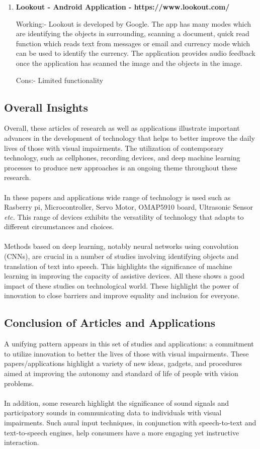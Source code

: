 \documentclass[MScCS]{uccthesis}
\begin{document}
\begin{enumerate}
\item \textbf{Lookout - Android Application - https://www.lookout.com/}

Working:-
Lookout is developed by Google.
The app has many modes which are identifying the objects in surrounding, scanning a document, quick read function which reads text from messages or email and currency mode which can be used to identify the currency.
The application provides audio feedback once the application has scanned the image and the objects in the image.

Cons:-
Limited functionality



\end{enumerate}


\subsection{Overall Insights}

Overall, these articles of research as well as applications illustrate important advances in the development of technology that helps to better improve the daily lives of those with visual impairments. The utilization of contemporary technology, such as cellphones, recording devices, and deep machine learning processes to produce new approaches is an ongoing theme throughout these research. \\
\\
In these papers and applications wide range of technology is used such as Rasberry pi, Microcontroller, Servo Motor, OMAP5910 board, Ultrasonic Sensor \textit{etc.} This range of devices exhibits the versatility of technology that adapts to different circumstances and choices.\\
\\
Methods based on deep learning, notably neural networks using convolution (CNNs), are crucial in a number of studies involving identifying objects and translation of text into speech. This highlights the significance of machine learning in improving the capacity of assistive devices. All these shows a good impact of these studies on technological world. These highlight the power of innovation to close barriers and improve equality and inclusion for everyone.

\subsection{Conclusion of Articles and Applications}
A unifying pattern appears in this set of studies and applications: a commitment to utilize innovation to better the lives of those with visual impairments. These papers/applications highlight a variety of new ideas, gadgets, and procedures aimed at improving the autonomy and standard of life of people with vision problems.\\
\\
In addition, some research highlight the significance of sound signals and participatory sounds in communicating data to individuals with visual impairments. Such aural input techniques, in conjunction with speech-to-text and text-to-speech engines, help consumers have a more engaging yet instructive interaction.
\end{document}
